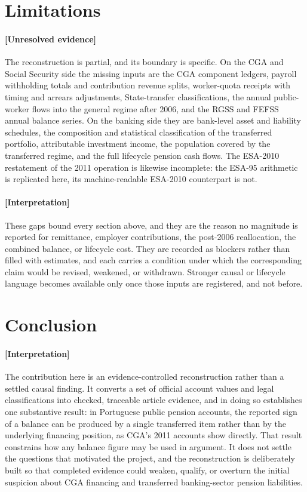 \documentclass[11pt]{article}
\begin{document}
\section{Limitations}
\label{sec:limitations}
\paragraph{[Unresolved evidence]}
The reconstruction is partial, and its boundary is specific. On the CGA and Social Security side the missing inputs are the CGA component ledgers, payroll withholding totals and contribution revenue splits, worker-quota receipts with timing and arrears adjustments, State-transfer classifications, the annual public-worker flows into the general regime after 2006, and the RGSS and FEFSS annual balance series. On the banking side they are bank-level asset and liability schedules, the composition and statistical classification of the transferred portfolio, attributable investment income, the population covered by the transferred regime, and the full lifecycle pension cash flows. The ESA-2010 restatement of the 2011 operation is likewise incomplete: the ESA-95 arithmetic is replicated here, its machine-readable ESA-2010 counterpart is not.

\paragraph{[Interpretation]}
These gaps bound every section above, and they are the reason no magnitude is reported for remittance, employer contributions, the post-2006 reallocation, the combined balance, or lifecycle cost. They are recorded as blockers rather than filled with estimates, and each carries a condition under which the corresponding claim would be revised, weakened, or withdrawn. Stronger causal or lifecycle language becomes available only once those inputs are registered, and not before.

\section{Conclusion}
\label{sec:conclusion}
\paragraph{[Interpretation]}
The contribution here is an evidence-controlled reconstruction rather than a settled causal finding. It converts a set of official account values and legal classifications into checked, traceable article evidence, and in doing so establishes one substantive result: in Portuguese public pension accounts, the reported sign of a balance can be produced by a single transferred item rather than by the underlying financing position, as CGA's 2011 accounts show directly. That result constrains how any balance figure may be used in argument. It does not settle the questions that motivated the project, and the reconstruction is deliberately built so that completed evidence could weaken, qualify, or overturn the initial suspicion about CGA financing and transferred banking-sector pension liabilities.


\end{document}
